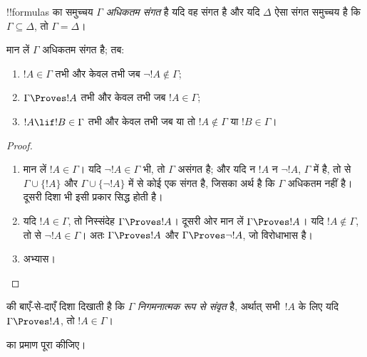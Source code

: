 \documentclass[../../../include/open-logic-section]{subfiles}
\begin{document}


\begin{defn}
!!{formula}s का समुच्चय $\Gamma$ \emph{अधिकतम संगत} है यदि वह संगत है और
यदि $\Delta$ ऐसा संगत समुच्चय है कि $\Gamma \subseteq \Delta$, तो $\Gamma
= \Delta$।
\end{defn}

\begin{lem}[सत्यता लेम्मा]
मान लें $\Gamma$ अधिकतम संगत है; तब:
\begin{enumerate}
\item {} $!A \in \Gamma$ तभी और केवल तभी जब $\lnot !A
  \notin \Gamma$;
\item {} $\Gamma \Proves !A$ तभी और केवल तभी जब $!A \in \Gamma$; 
\item {} $!A \lif !B \in \Gamma$ तभी और केवल तभी जब
  या तो $!A \notin \Gamma$ या $!B \in \Gamma$।
\end{enumerate}
\end{lem}

\begin{proof}
\begin{enumerate}
\item मान लें $!A \in \Gamma$। यदि $\lnot !A \in \Gamma$ भी, तो $\Gamma$
  असंगत है; और यदि न $!A$ न $\lnot!A$, $\Gamma$ में है, तो
   से $\Gamma\cup\{!A\}$ और $\Gamma \cup \{\lnot
  !A\}$ में से कोई एक संगत है, जिसका अर्थ है कि $\Gamma$ अधिकतम नहीं है।
  दूसरी दिशा भी इसी प्रकार सिद्ध होती है।
\item यदि $!A \in \Gamma$, तो निस्संदेह $\Gamma \Proves !A$। दूसरी ओर
  मान लें $\Gamma \Proves !A$। यदि $!A \notin \Gamma$, तो
   से $\lnot !A \in \Gamma$। अतः $\Gamma \Proves !A$
  और $\Gamma \Proves \lnot !A$, जो विरोधाभास है।
\item अभ्यास।
\end{enumerate}
\end{proof}

 की बाएँ-से-दाएँ दिशा दिखाती है कि
$\Gamma$ \emph{निगमनात्मक रूप से संवृत} है, अर्थात् सभी~$!A$ के लिए यदि
$\Gamma \Proves !A$, तो $!A \in \Gamma$।

\begin{prob}
   का प्रमाण पूरा कीजिए।
\end{prob}
\end{document}
